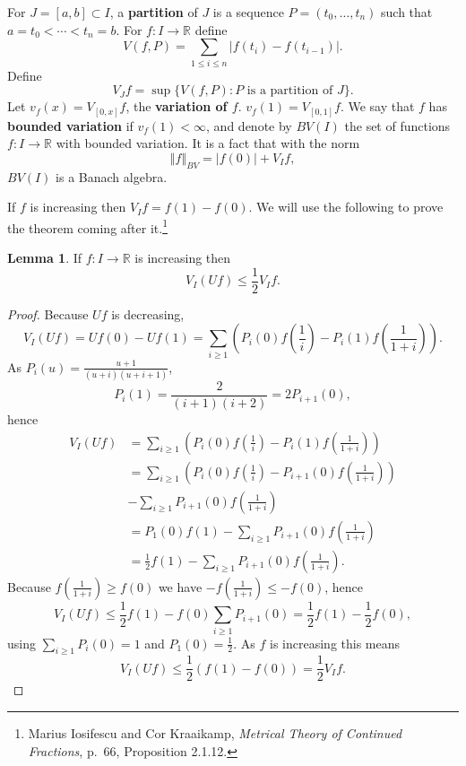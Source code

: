 \documentclass{article}
\newcommand{\norm}[1]{\left\Vert #1 \right\Vert}
\theoremstyle{definition}
\newtheorem{lemma}[theorem]{Lemma}
\theoremstyle{definition}
\begin{document}
For $J=[a,b] \subset I$, 
a \textbf{partition} of $J$ is a sequence $P=(t_0,\ldots,t_n)$ such that $a=t_0<\cdots<t_n=b$. 
For $f:I \to \mathbb{R}$ define
\[
V(f,P) = \sum_{1 \leq i \leq n} |f(t_i)-f(t_{i-1})|.
\]
Define
\[
V_J f = \sup\{V(f,P): \textrm{$P$ is a partition of $J$}\}.
\]
Let $v_f(x) = V_{[0,x]} f$, the \textbf{variation of $f$}. $v_f(1)=V_{[0,1]} f$. 
We say that $f$ has \textbf{bounded variation} if $v_f(1)< \infty$, and denote by $BV(I)$ the set of
functions $f:I \to \mathbb{R}$ with bounded variation. It is a fact that
with the norm
\[
\norm{f}_{BV} = |f(0)| + V_I f,
\]
$BV(I)$ is a Banach algebra.

If $f$ is increasing then $V_I f = f(1)-f(0)$. We will use the following to prove the theorem coming after it.\footnote{Marius Iosifescu and Cor Kraaikamp,
{\em Metrical Theory of Continued Fractions}, p.~66, Proposition 2.1.12.}

\begin{lemma}
If $f:I \to \mathbb{R}$ is increasing then 
\[
V_I (Uf) \leq \frac{1}{2} V_I f.
\]
\end{lemma}
\begin{proof}
Because $Uf$ is decreasing, 
\[
V_I(Uf) = Uf(0)-Uf(1) = \sum_{i \geq 1} \left( P_i(0)f\left(\frac{1}{i}\right) - P_i(1) f\left(\frac{1}{1+i}\right)\right).
\]
As $P_i(u)=\frac{u+1}{(u+i)(u+i+1)}$,
\[
P_i(1) = \frac{2}{(i+1)(i+2)} = 2P_{i+1}(0),
\]
hence 
\begin{align*}
V_I(Uf)&=\sum_{i \geq 1} \left( P_i(0)f\left(\frac{1}{i}\right) - P_i(1) f\left(\frac{1}{1+i}\right)\right)\\
&=\sum_{i \geq 1}  \left( P_i(0)f\left(\frac{1}{i}\right) - P_{i+1}(0) f\left(\frac{1}{1+i}\right)\right)\\
&-\sum_{i \geq 1} P_{i+1}(0) f\left(\frac{1}{1+i}\right)\\
&=P_1(0)f(1) -\sum_{i \geq 1} P_{i+1}(0) f\left(\frac{1}{1+i}\right)\\
&=\frac{1}{2}f(1) - \sum_{i \geq 1} P_{i+1}(0) f\left(\frac{1}{1+i}\right).
\end{align*}
Because $ f\left(\frac{1}{1+i}\right) \geq f(0)$ we have  $- f\left(\frac{1}{1+i}\right) \leq - f(0)$, hence 
\[
V_I(Uf) \leq \frac{1}{2}f(1) -f(0) \sum_{i \geq 1} P_{i+1}(0) = \frac{1}{2}f(1)  - \frac{1}{2}f(0),
\]
using $\sum_{i \geq 1} P_i(0) = 1$ and $P_1(0)=\frac{1}{2}$. 
As $f$ is increasing this means
\[
V_I(Uf) \leq \frac{1}{2}(f(1)-f(0)) = \frac{1}{2} V_I f.
\]
\end{proof}
\end{document}
